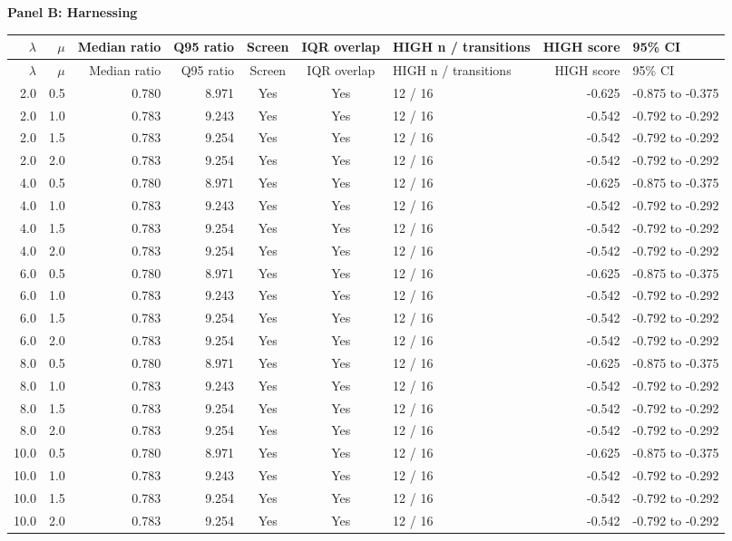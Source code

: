 \clearpage
\thispagestyle{empty}
\begin{center}\textbf{Panel B: Harnessing}\end{center}\par\vspace{0.4em}
\begin{longtable}{r r r r c c l r p{2.7cm}}
\toprule
$\lambda$ & $\mu$ & Median ratio & Q95 ratio & Screen & IQR overlap & HIGH n / transitions & HIGH score & 95\% CI \\
\midrule\endfirsthead
\toprule
$\lambda$ & $\mu$ & Median ratio & Q95 ratio & Screen & IQR overlap & HIGH n / transitions & HIGH score & 95\% CI \\
\midrule\endhead
2.0 & 0.5 & 0.780 & 8.971 & Yes & Yes & 12 / 16 & -0.625 & -0.875 to -0.375 \\
2.0 & 1.0 & 0.783 & 9.243 & Yes & Yes & 12 / 16 & -0.542 & -0.792 to -0.292 \\
2.0 & 1.5 & 0.783 & 9.254 & Yes & Yes & 12 / 16 & -0.542 & -0.792 to -0.292 \\
2.0 & 2.0 & 0.783 & 9.254 & Yes & Yes & 12 / 16 & -0.542 & -0.792 to -0.292 \\
4.0 & 0.5 & 0.780 & 8.971 & Yes & Yes & 12 / 16 & -0.625 & -0.875 to -0.375 \\
4.0 & 1.0 & 0.783 & 9.243 & Yes & Yes & 12 / 16 & -0.542 & -0.792 to -0.292 \\
4.0 & 1.5 & 0.783 & 9.254 & Yes & Yes & 12 / 16 & -0.542 & -0.792 to -0.292 \\
4.0 & 2.0 & 0.783 & 9.254 & Yes & Yes & 12 / 16 & -0.542 & -0.792 to -0.292 \\
6.0 & 0.5 & 0.780 & 8.971 & Yes & Yes & 12 / 16 & -0.625 & -0.875 to -0.375 \\
6.0 & 1.0 & 0.783 & 9.243 & Yes & Yes & 12 / 16 & -0.542 & -0.792 to -0.292 \\
6.0 & 1.5 & 0.783 & 9.254 & Yes & Yes & 12 / 16 & -0.542 & -0.792 to -0.292 \\
6.0 & 2.0 & 0.783 & 9.254 & Yes & Yes & 12 / 16 & -0.542 & -0.792 to -0.292 \\
8.0 & 0.5 & 0.780 & 8.971 & Yes & Yes & 12 / 16 & -0.625 & -0.875 to -0.375 \\
8.0 & 1.0 & 0.783 & 9.243 & Yes & Yes & 12 / 16 & -0.542 & -0.792 to -0.292 \\
8.0 & 1.5 & 0.783 & 9.254 & Yes & Yes & 12 / 16 & -0.542 & -0.792 to -0.292 \\
8.0 & 2.0 & 0.783 & 9.254 & Yes & Yes & 12 / 16 & -0.542 & -0.792 to -0.292 \\
10.0 & 0.5 & 0.780 & 8.971 & Yes & Yes & 12 / 16 & -0.625 & -0.875 to -0.375 \\
10.0 & 1.0 & 0.783 & 9.243 & Yes & Yes & 12 / 16 & -0.542 & -0.792 to -0.292 \\
10.0 & 1.5 & 0.783 & 9.254 & Yes & Yes & 12 / 16 & -0.542 & -0.792 to -0.292 \\
10.0 & 2.0 & 0.783 & 9.254 & Yes & Yes & 12 / 16 & -0.542 & -0.792 to -0.292 \\
\bottomrule
\end{longtable}
